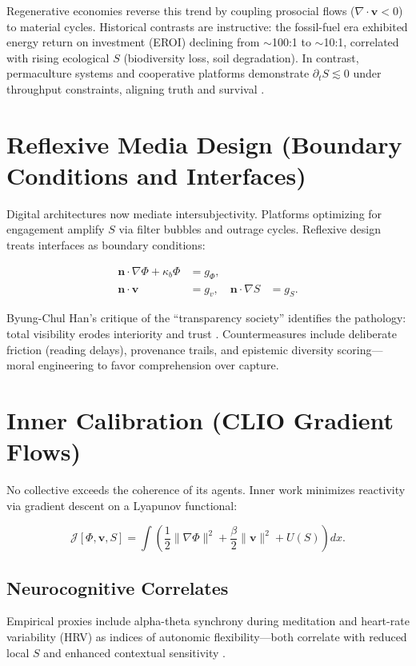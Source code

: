 \documentclass[12pt,a4paper]{article}
\begin{document}
Regenerative economies reverse this trend by coupling prosocial flows ($\nabla\!\cdot\!\bm{v} < 0$) to material cycles. Historical contrasts are instructive: the fossil-fuel era exhibited energy return on investment (EROI) declining from $\sim$100:1 to $\sim$10:1, correlated with rising ecological $S$ (biodiversity loss, soil degradation). In contrast, permaculture systems and cooperative platforms demonstrate $\partial_t S \lesssim 0$ under throughput constraints, aligning truth and survival \cite{schmachtenberger2020metacrisis}.

\section{Reflexive Media Design (Boundary Conditions and Interfaces)}
Digital architectures now mediate intersubjectivity. Platforms optimizing for engagement amplify $S$ via filter bubbles and outrage cycles. Reflexive design treats interfaces as boundary conditions:

\begin{align}
\bm{n}\!\cdot\!\nabla \Phi + \kappa_b \Phi &= g_\Phi, \\
\bm{n}\!\cdot\!\bm{v} &= g_v, \quad
\bm{n}\!\cdot\!\nabla S &= g_S.
\label{eq:boundary}
\end{align}

Byung-Chul Han’s critique of the “transparency society” identifies the pathology: total visibility erodes interiority and trust \cite{han2015transparency,han2015burnout}. Countermeasures include deliberate friction (reading delays), provenance trails, and epistemic diversity scoring—moral engineering to favor comprehension over capture.

\section{Inner Calibration (CLIO Gradient Flows)}
No collective exceeds the coherence of its agents. Inner work minimizes reactivity via gradient descent on a Lyapunov functional:

\begin{equation}
\mathcal{J}[\Phi,\bm{v},S] = \int \left( \frac{1}{2}\|\nabla \Phi\|^2 + \frac{\beta}{2}\|\bm{v}\|^2 + U(S) \right) dx.
\label{eq:lyapunov}
\end{equation}

\subsection{Neurocognitive Correlates}
Empirical proxies include alpha-theta synchrony during meditation and heart-rate variability (HRV) as indices of autonomic flexibility—both correlate with reduced local $S$ and enhanced contextual sensitivity \cite{varela1991embodied}.
\end{document}
